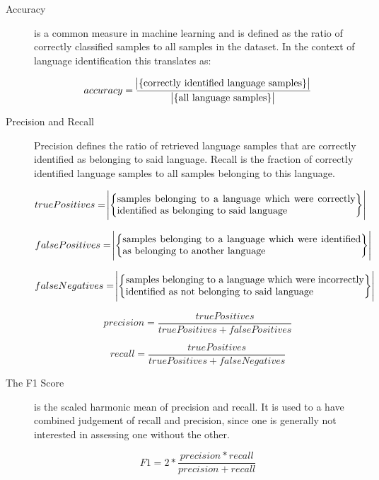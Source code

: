 \begin{description}
    \item[Accuracy] is a common measure in machine learning and is defined as the ratio of correctly classified samples to all samples in the dataset. In the context of language identification this translates as:
     
    	$$
		accuracy = \frac{\abs{\{\text{correctly identified language samples}\}}}{\abs{\{\text{all language samples}\}}}
		$$
     
    
    \item[Precision and Recall] Precision defines the ratio of retrieved language samples that are correctly identified as belonging to said language. Recall is the fraction of correctly identified language samples to all samples belonging to this language.
     
		$$
 		truePositives = \abs{\left\{\parbox{0.7\textwidth}{samples belonging to a language which were correctly identified as belonging to said language}\right\}} 
		$$
		
		$$
 		falsePositives = \abs{\left\{\parbox{0.7\textwidth}{samples belonging to a language which were identified as belonging to another language}\right\}}  
		$$
		
		$$
 		falseNegatives = \abs{\left\{\parbox{0.7\textwidth}{samples belonging to a language which were incorrectly identified as not belonging to said language}\right\}}  
		$$

	    $$
	    precision = \frac
	      {truePositives}
	      {truePositives + falsePositives}
	    $$
		
		$$
		recall = \frac
			{truePositives}
			{truePositives + falseNegatives}
		$$    


    \item[The F1 Score] is the scaled harmonic mean of precision and recall. It is used to a have combined judgement of recall and precision, since one is generally not interested in assessing one without the other.
    
    	$$
    	F1 = 2 * \frac{precision * recall}{precision + recall}
    	$$

\end{description}

